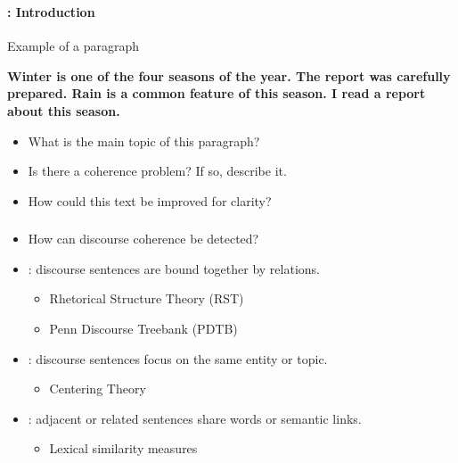 \documentclass[xcolor=table]{beamer}
\subtitle[10- Discourse coherence]{Chapter 10\\Discourse coherence}
\begin{document}
	
\begin{frame}
	\frametitle{\inserttitle}
	\framesubtitle{\insertshortsubtitle: Introduction}

	\begin{exampleblock}{Example of a paragraph}
		\begin{center}
			\Large\bfseries
			Winter is one of the four seasons of the year.
			The report was carefully prepared.
			Rain is a common feature of this season.
			I read a report about this season.
		\end{center}
	\end{exampleblock}
	
	\begin{itemize}
		\item What is the main topic of this paragraph?
		\item Is there a coherence problem? If so, describe it.
		\item How could this text be improved for clarity?
	\end{itemize}
	

\end{frame}

\begin{frame}
	\frametitle{\inserttitle}
	\framesubtitle{\insertshortsubtitle}
	
	\begin{itemize}
		\item How can discourse coherence be detected?
		\item {}: discourse sentences are bound together by relations.
		\begin{itemize}
			\item Rhetorical Structure Theory (RST) 
			\item Penn Discourse Treebank (PDTB)
		\end{itemize}
		\item {}: discourse sentences focus on the same entity or topic.
		\begin{itemize}
			\item Centering Theory 
		\end{itemize}
		\item {}: adjacent or related sentences share words or semantic links.
		\begin{itemize}
			\item Lexical similarity measures
		\end{itemize}
	\end{itemize}
	
\end{frame}
\end{document}
